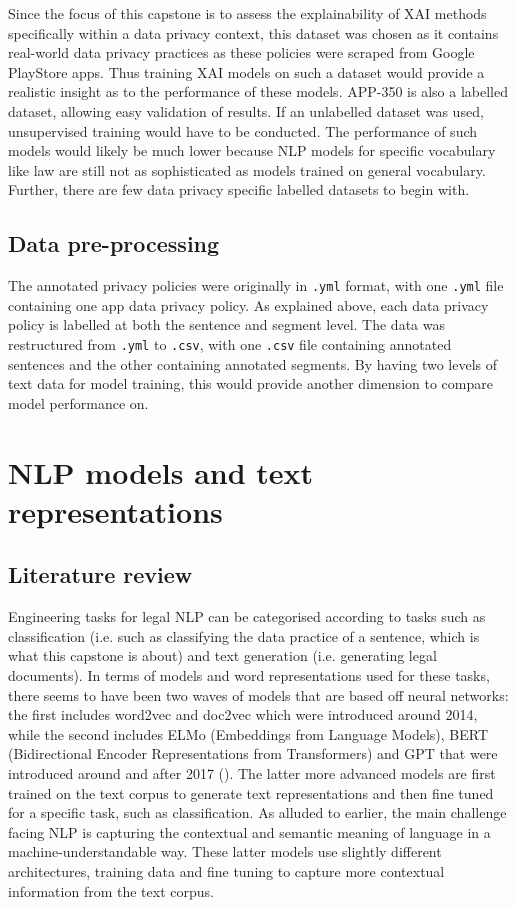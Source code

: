 Since the focus of this capstone is to assess the explainability of XAI methods specifically within a data privacy context, this dataset was chosen as it contains real-world data privacy practices as these policies were scraped from Google PlayStore apps. Thus training XAI models on such a dataset would provide a realistic insight as to the performance of these models. APP-350 is also a labelled dataset, allowing easy validation of results. If an unlabelled dataset was used, unsupervised training would have to be conducted. The performance of such models would likely be much lower because NLP models for specific vocabulary like law are still not as sophisticated as models trained on general vocabulary. Further, there are few data privacy specific labelled datasets to begin with. 

\subsection{Data pre-processing}
The annotated privacy policies were originally in \texttt{.yml} format, with one \texttt{.yml} file containing one app data privacy policy. As explained above, each data privacy policy is labelled at both the sentence and segment level. The data was restructured from \texttt{.yml} to \texttt{.csv}, with one \texttt{.csv} file containing annotated sentences and the other containing annotated segments. By having two levels of text data for model training, this would provide another dimension to compare model performance on.

\section{NLP models and text representations}
\subsection{Literature review}
Engineering tasks for legal NLP can be categorised according to tasks such as classification (i.e. such as classifying the data practice of a sentence, which is what this capstone is about) and text generation (i.e. generating legal documents). In terms of models and word representations used for these tasks, there seems to have been two waves of models that are based off neural networks: the first includes word2vec and doc2vec which were introduced around 2014, while the second includes ELMo (Embeddings from Language Models), BERT (Bidirectional Encoder Representations from Transformers) and GPT that were introduced around and after 2017 (\cite{katz_nlp_legal}). The latter more advanced models are first trained on the text corpus to generate text representations and then fine tuned for a specific task, such as classification. As alluded to earlier, the main challenge facing NLP is capturing the contextual and semantic meaning of language in a machine-understandable way. These latter models use slightly different architectures, training data and fine tuning to capture more contextual information from the text corpus.

